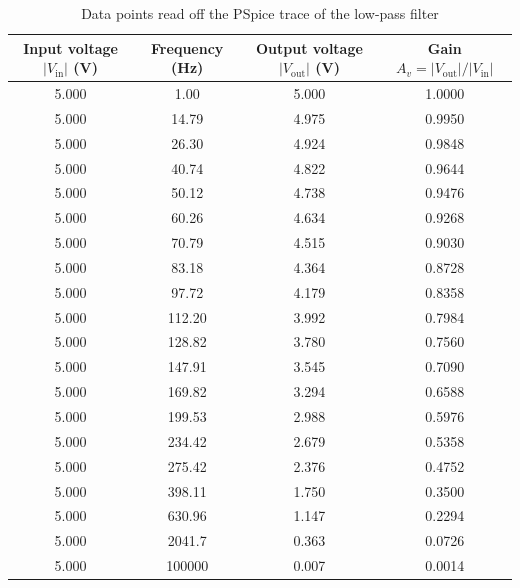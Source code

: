 \documentclass[12pt,a4paper]{article}
\begin{document}
	\begin{table}[H]
		\centering
		\caption{Data points read off the PSpice trace of the low-pass filter}
		\label{tab:data1}
		\small
		\renewcommand{\arraystretch}{1.2}
		\begin{tabular}{|c|c|c|c|}
			\hline
			\rowcolor{black!12}\textbf{Input voltage $|V_{\mathrm{in}}|$ (V)} & \textbf{Frequency (Hz)} & \textbf{Output voltage $|V_{\mathrm{out}}|$ (V)} & \textbf{Gain $A_v = |V_{\mathrm{out}}|/|V_{\mathrm{in}}|$} \\
			\hline
			\num{5.000} & \num{1.00} & \num{5.000} & \num{1.0000}\\
			\hline
			\num{5.000} & \num{14.79} & \num{4.975} & \num{0.9950}\\
			\hline
			\num{5.000} & \num{26.30} & \num{4.924} & \num{0.9848}\\
			\hline
			\num{5.000} & \num{40.74} & \num{4.822} & \num{0.9644}\\
			\hline
			\num{5.000} & \num{50.12} & \num{4.738} & \num{0.9476}\\
			\hline
			\num{5.000} & \num{60.26} & \num{4.634} & \num{0.9268}\\
			\hline
			\num{5.000} & \num{70.79} & \num{4.515} & \num{0.9030}\\
			\hline
			\num{5.000} & \num{83.18} & \num{4.364} & \num{0.8728}\\
			\hline
			\num{5.000} & \num{97.72} & \num{4.179} & \num{0.8358}\\
			\hline
			\num{5.000} & \num{112.20} & \num{3.992} & \num{0.7984}\\
			\hline
			\num{5.000} & \num{128.82} & \num{3.780} & \num{0.7560}\\
			\hline
			\num{5.000} & \num{147.91} & \num{3.545} & \num{0.7090}\\
			\hline
			\num{5.000} & \num{169.82} & \num{3.294} & \num{0.6588}\\
			\hline
			\num{5.000} & \num{199.53} & \num{2.988} & \num{0.5976}\\
			\hline
			\num{5.000} & \num{234.42} & \num{2.679} & \num{0.5358}\\
			\hline
			\num{5.000} & \num{275.42} & \num{2.376} & \num{0.4752}\\
			\hline
			\num{5.000} & \num{398.11} & \num{1.750} & \num{0.3500}\\
			\hline
			\num{5.000} & \num{630.96} & \num{1.147} & \num{0.2294}\\
			\hline
			\num{5.000} & \num{2041.7} & \num{0.363} & \num{0.0726}\\
			\hline
			\num{5.000} & \num{100000} & \num{0.007} & \num{0.0014} \\
			\hline
		\end{tabular}
	\end{table}
\end{document}
